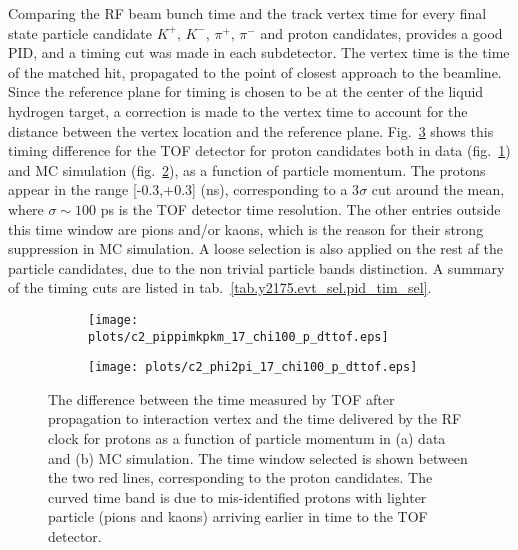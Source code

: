 Comparing the RF beam bunch time and the track vertex time for every final state particle candidate $K^{+}$, $K^{-}$, $\pi^{+}$, $\pi^{-}$ and proton candidates, provides a good PID, and a timing cut was made in each subdetector. The vertex time is the time of the matched hit, propagated to the point of closest approach to the beamline. Since the reference plane for timing is chosen to be at the center of the liquid hydrogen target, a correction is made to the vertex time to account for the distance between the vertex location and the reference plane. Fig.~\ref{fig.y2175.evt_sel.pid_tim_sel} shows this timing difference for the TOF detector for proton candidates both in data (fig.~\ref{fig.y2175.evt_sel.pid_tim_sel.a}) and MC simulation (fig.~\ref{fig.y2175.evt_sel.pid_tim_sel.b}), as a function of particle momentum. The protons appear in the range [-0.3,+0.3] (ns), corresponding to a 3$\sigma$ cut around the mean, where $\sigma \sim 100$ ps is the TOF detector time resolution. The other entries outside this time window are pions and/or kaons, which is the reason for their strong suppression in MC simulation. A loose selection is also applied on the rest af the particle candidates, due to the non trivial particle bands distinction. A summary of the timing cuts are listed in tab.~\ref{tab.y2175.evt_sel.pid_tim_sel}.

\begin{figure}[H]
    \centering
    \begin{subfigure}[b]{0.5\textwidth}
        \texttt{[image: plots/c2\_pippimkpkm\_17\_chi100\_p\_dttof.eps]}
        \caption{}
        \label{fig.y2175.evt_sel.pid_tim_sel.a}
    \end{subfigure}\hfill
    \begin{subfigure}[b]{0.5\textwidth}
        \texttt{[image: plots/c2\_phi2pi\_17\_chi100\_p\_dttof.eps]}
        \caption{}
        \label{fig.y2175.evt_sel.pid_tim_sel.b}
    \end{subfigure}
    \caption{The difference between the time measured by TOF after propagation to interaction vertex and the time delivered by the RF clock for protons as a function of particle momentum in (a) data and (b) MC simulation. The time window selected is shown between the two red lines, corresponding to the proton candidates. The curved time band is due to mis-identified protons with lighter particle (pions and kaons) arriving earlier in time to the TOF detector.}
    \label{fig.y2175.evt_sel.pid_tim_sel}
\end{figure}

